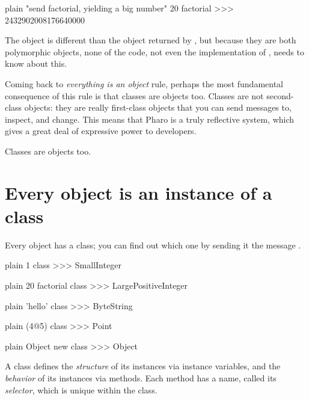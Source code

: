 \documentclass[10pt,twoside,english]{_support/latex/sbabook/sbabook}
\begin{document}
\begin{displaycode}{plain}
"send factorial, yielding a big number"
20 factorial
>>> 2432902008176640000
\end{displaycode}

The object  is different than the object returned by , but
because they are both polymorphic objects, none of the code, not even the
implementation of , needs to know about this.

Coming back to \textit{everything is an object} rule, perhaps the most fundamental
consequence of this rule is that classes are objects too. Classes are not
second-class objects: they are really first-class objects that you can send
messages to, inspect, and change. This means that Pharo is a truly reflective
system, which gives a great deal of expressive power to developers.

\begin{important}
Classes are objects too.
\end{important}
\chapter{Every object is an instance of a class}
Every object has a class; you can find out which one by sending it the message
.

\begin{displaycode}{plain}
1 class
>>> SmallInteger
\end{displaycode}

\begin{displaycode}{plain}
20 factorial class
>>> LargePositiveInteger
\end{displaycode}

\begin{displaycode}{plain}
'hello' class
>>> ByteString
\end{displaycode}

\begin{displaycode}{plain}
(4@5) class
>>> Point
\end{displaycode}

\begin{displaycode}{plain}
Object new class
>>> Object
\end{displaycode}

A class defines the \textit{structure} of its instances via instance variables, and
the \textit{behavior} of its instances via methods. Each method has a name, called
its \textit{selector}, which is unique within the class.
\end{document}
